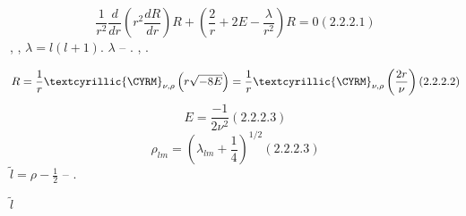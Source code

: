 \documentclass[a4paper]{article}
\begin{document}
\begin{equation*}
\frac 1{r^2}\frac d{\mathit{dr}}\left(r^2\frac{dR}{\mathit{dr}}\right)R+\left(\frac 2 r+2E-\frac{\lambda
}{r^2}\right)R=0(2.2.2.1)
\end{equation*}
{\CYRL}{\cyre}{\cyrg}{\cyrk}{\cyro} {\cyrm}{\cyro}{\cyrzh}{\cyrn}{\cyro} {\cyrv}{\cyri}{\cyrd}{\cyre}{\cyrt}{\cyrsftsn},
{\cyrch}{\cyrt}{\cyro} {\cyrp}{\cyro} {\cyrv}{\cyri}{\cyrd}{\cyru} {\cyro}{\cyrn}{\cyro}
{\cyra}{\cyrb}{\cyrs}{\cyro}{\cyrl}{\cyryu}{\cyrt}{\cyrn}{\cyro}
{\cyra}{\cyrn}{\cyra}{\cyrl}{\cyro}{\cyrg}{\cyri}{\cyrch}{\cyrn}{\cyro}
{\cyrs}{\cyro}{\cyro}{\cyrt}{\cyrv}{\cyre}{\cyrt}{\cyrs}{\cyrt}{\cyrv}{\cyru}{\cyryu}{\cyrshch}{\cyre}{\cyrm}{\cyru}
{\cyrk}{\cyru}{\cyrl}{\cyro}{\cyrn}{\cyro}{\cyrv}{\cyrs}{\cyrk}{\cyro}{\cyrm}{\cyru}
{\cyru}{\cyrr}{\cyra}{\cyrv}{\cyrn}{\cyre}{\cyrn}{\cyri}{\cyryu}, {\cyrs}
{\cyrz}{\cyra}{\cyrm}{\cyre}{\cyrn}{\cyro}{\cyrishrt}  $\lambda =l(l+1)$.  $\lambda $ --
{\cyrs}{\cyro}{\cyrb}{\cyrs}{\cyrt}{\cyrv}{\cyre}{\cyrn}{\cyrn}{\cyro}{\cyre}
{\cyrz}{\cyrn}{\cyra}{\cyrch}{\cyre}{\cyrn}{\cyri}{\cyre}
{\cyru}{\cyrr}{\cyra}{\cyrv}{\cyrn}{\cyre}{\cyrn}{\cyri}{\cyrya} {\cyrn}{\cyra}
{\cyru}{\cyrg}{\cyrl}{\cyro}{\cyrv}{\cyru}{\cyryu} {\cyrch}{\cyra}{\cyrs}{\cyrt}{\cyrsftsn}.
{\CYRS}{\cyro}{\cyro}{\cyrt}{\cyrv}{\cyre}{\cyrt}{\cyrs}{\cyrt}{\cyrv}{\cyre}{\cyrn}{\cyrn}{\cyro},
{\cyrr}{\cyre}{\cyrsh}{\cyre}{\cyrn}{\cyri}{\cyrya} {\cyrb}{\cyru}{\cyrd}{\cyru}{\cyrt}
{\cyrt}{\cyra}{\cyrk}{\cyri}{\cyre} {\cyrzh}{\cyre} {\cyrp}{\cyro} {\cyrv}{\cyri}{\cyrd}{\cyru}. 

\begin{equation*}
R=\frac 1 r\text{\textcyrillic{{\CYRM}}}_{\nu ,\rho }\left(r\sqrt{-8E}\right)=\frac 1
r\text{\textcyrillic{{\CYRM}}}_{\nu ,\rho }\left(\frac{2r}{\nu }\right)(2.2.2.2)
\end{equation*}
\begin{equation*}
E=\frac{-1}{2\nu ^2}(2.2.2.3)
\end{equation*}
\begin{equation*}
\rho _{\mathit{lm}}=\left(\lambda _{\mathit{lm}}+\frac 1 4\right)^{1/2}(2.2.2.3)
\end{equation*}
{\CYRV}{\cyrv}{\cyre}{\cyrd}{\cyre}{\cyrm} {\cyrp}{\cyro}{\cyrn}{\cyrya}{\cyrt}{\cyri}{\cyre}  $\widetilde l=\rho -\frac
1 2$ -- {\cyrk}{\cyrv}{\cyra}{\cyrz}{\cyri}{\cyru}{\cyrg}{\cyrl}{\cyro}{\cyrv}{\cyro}{\cyrishrt}
{\cyrm}{\cyro}{\cyrm}{\cyre}{\cyrn}{\cyrt}.

{\CYRP}{\cyrr}{\cyri}{\cyrv}{\cyre}{\cyrd}{\cyre}{\cyrm} {\cyrt}{\cyra}{\cyrb}{\cyrl}{\cyri}{\cyrc}{\cyru}
{\cyrz}{\cyrn}{\cyra}{\cyrch}{\cyre}{\cyrn}{\cyri}{\cyrishrt}  $\widetilde l$ {\cyrv}
{\cyrz}{\cyra}{\cyrv}{\cyri}{\cyrs}{\cyri}{\cyrm}{\cyro}{\cyrs}{\cyrt}{\cyri} {\cyro}{\cyrt}
{\cyrz}{\cyrn}{\cyra}{\cyrch}{\cyre}{\cyrn}{\cyri}{\cyrishrt}
{\cyrd}{\cyri}{\cyrp}{\cyro}{\cyrl}{\cyrsftsn}{\cyrn}{\cyro}{\cyrg}{\cyro}
{\cyrm}{\cyro}{\cyrm}{\cyre}{\cyrn}{\cyrt}{\cyra}
\end{document}

